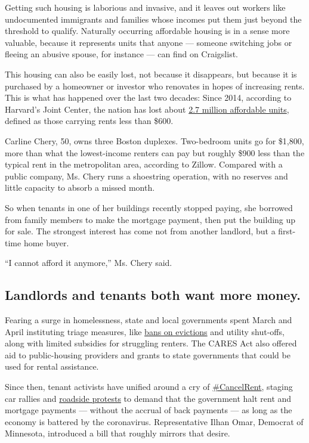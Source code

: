 Getting such housing is laborious and invasive, and it leaves out
workers like undocumented immigrants and families whose incomes put them
just beyond the threshold to qualify. Naturally occurring affordable
housing is in a sense more valuable, because it represents units that
anyone --- someone switching jobs or fleeing an abusive spouse, for
instance --- can find on Craigslist.

This housing can also be easily lost, not because it disappears, but
because it is purchased by a homeowner or investor who renovates in
hopes of increasing rents. This is what has happened over the last two
decades: Since 2014, according to Harvard's Joint Center, the nation has
lost about
\href{https://www.jchs.harvard.edu/blog/the-continuing-decline-of-low-cost-rentals/}{2.7
million affordable units}, defined as those carrying rents less than
\$600.

Carline Chery, 50, owns three Boston duplexes. Two-bedroom units go for
\$1,800, more than what the lowest-income renters can pay but roughly
\$900 less than the typical rent in the metropolitan area, according to
Zillow. Compared with a public company, Ms. Chery runs a shoestring
operation, with no reserves and little capacity to absorb a missed
month.

So when tenants in one of her buildings recently stopped paying, she
borrowed from family members to make the mortgage payment, then put the
building up for sale. The strongest interest has come not from another
landlord, but a first-time home buyer.

``I cannot afford it anymore,'' Ms. Chery said.

\hypertarget{landlords-and-tenants-both-want-more-money}{%
\subsection{Landlords and tenants both want more
money.}\label{landlords-and-tenants-both-want-more-money}}

Fearing a surge in homelessness, state and local governments spent March
and April instituting triage measures, like
\href{https://nlihc.org/eviction-and-foreclosure-moratoriums}{bans on
evictions} and utility shut-offs, along with limited subsidies for
struggling renters. The CARES Act also offered aid to public-housing
providers and grants to state governments that could be used for rental
assistance.

Since then, tenant activists have unified around a cry of
\href{https://www.nytimes.com/2020/05/01/nyregion/rent-strike-coronavirus.html}{\#CancelRent},
staging car rallies and
\href{https://www.nytimes.com/2020/04/23/business/economy/coronavirus-tenants-rent-protests.html}{roadside
protests} to demand that the government halt rent and mortgage payments
--- without the accrual of back payments --- as long as the economy is
battered by the coronavirus. Representative Ilhan Omar, Democrat of
Minnesota, introduced a bill that roughly mirrors that desire.

